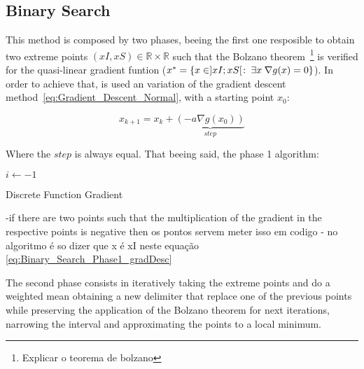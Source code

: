 

\subsection{Binary Search}
\label{subsec:Binary_Search}

This method is composed by two phases, beeing the first one resposible to obtain two extreme points \((xI,xS) \in \mathbb{R} \times \mathbb{R}\) such that the Bolzano theorem~\footnote{Explicar o teorema de bolzano} is verified for the quasi-linear gradient funtion (\(  x^*= \{ x \in ]xI; xS[ \hspace{0.1em}  : \hspace{0.25em} \exists x \hspace{0.25em}\nabla g(x) = 0 \} \)). In order to achieve that, is used an variation of the gradient descent method~\ref{eq:Gradient_Descent_Normal}, with a starting point \(x_0\):

\begin{equation}
    x_{k+1} = x_k + \underbrace{(- a \nabla g(x_0))}_{step}
    \label{eq:Binary_Search_Phase1_gradDesc}
\end{equation}

Where the \(step\) is always equal. That beeing said, the phase 1 algorithm: 

  \begin{algorithm}
    $i\gets -1$\;
    \caption{Discrete Function Gradient } \label{alg:Discrete_Function_Gradient}
  \end{algorithm}


-if there are two points such that the multiplication of the gradient in the respective points is negative then os pontos servem meter isso em codigo
- no algoritmo é so dizer que x é xI neste equação \ref{eq:Binary_Search_Phase1_gradDesc}




The second phase consists in iteratively taking the extreme points and do a weighted mean obtaining a new delimiter that replace one of the previous points while preserving the application of the Bolzano theorem for next iterations, narrowing the interval and approximating the points to a local minimum.   





